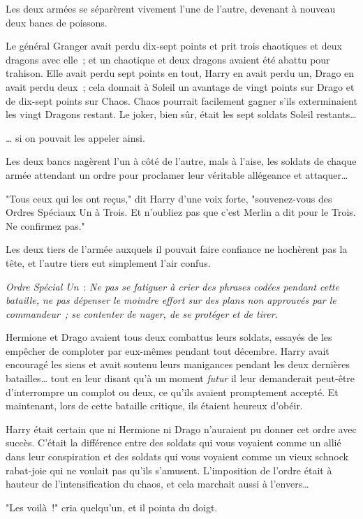 Les deux armées se séparèrent vivement l'une de l'autre, devenant à nouveau deux bancs de poissons.

Le général Granger avait perdu dix-sept points et prit trois chaotiques et deux dragons avec elle~; et un chaotique et deux dragons avaient été abattu pour trahison. Elle avait perdu sept points en tout, Harry en avait perdu un, Drago en avait perdu deux~; cela donnait à Soleil un avantage de vingt points sur Drago et de dix-sept points sur Chaos. Chaos pourrait facilement gagner s'ils exterminaient les vingt Dragons restant. Le joker, bien sûr, était les sept soldats Soleil restants…

… si on pouvait les appeler ainsi.

Les deux bancs nagèrent l'un à côté de l'autre, mals à l'aise, les soldats de chaque armée attendant un ordre pour proclamer leur véritable allégeance et attaquer…

"Tous ceux qui les ont reçus," dit Harry d'une voix forte, "souvenez-vous des Ordres Spéciaux Un à Trois. Et n'oubliez pas que c'est Merlin a dit pour le Trois. Ne confirmez pas."

Les deux tiers de l'armée auxquels il pouvait faire confiance ne hochèrent pas la tête, et l'autre tiers eut simplement l'air confus.

\emph{Ordre Spécial Un}~: \emph{Ne pas se fatiguer à crier des phrases codées pendant cette bataille, ne pas dépenser le moindre effort sur des plans non approuvés par le commandeur~; se contenter de nager, de se protéger et de tirer.}

Hermione et Drago avaient tous deux combattus leurs soldats, essayés de les empêcher de comploter par eux-mêmes pendant tout décembre. Harry avait encouragé les siens et avait soutenu leurs manigances pendant les deux dernières batailles… tout en leur disant qu'à un moment \emph{futur} il leur demanderait peut-être d'interrompre un complot ou deux, ce qu'ils avaient promptement accepté. Et maintenant, lors de cette bataille critique, ils étaient heureux d'obéir.

Harry était certain que ni Hermione ni Drago n'auraient pu donner cet ordre avec succès. C'était la différence entre des soldats qui vous voyaient comme un allié dans leur conspiration et des soldats qui vous voyaient comme un vieux schnock rabat-joie qui ne voulait pas qu'ils s'amusent. L'imposition de l'ordre était à hauteur de l'intensification du chaos, et cela marchait aussi à l'envers…

"Les voilà~!" cria quelqu'un, et il pointa du doigt.

